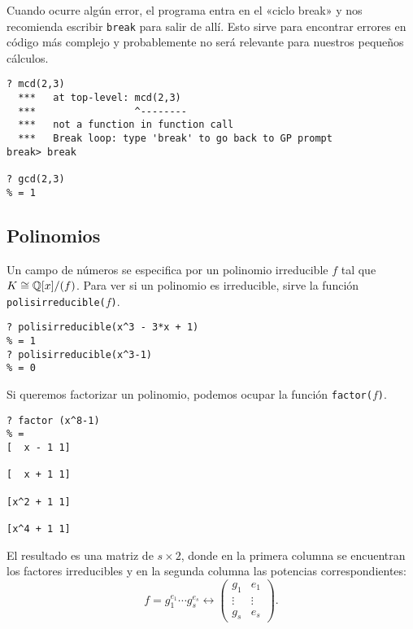 Cuando ocurre algún error, el programa entra en el «ciclo break» y nos
recomienda escribir \texttt{break} para salir de allí. Esto sirve para encontrar
errores en código más complejo y probablemente no será relevante para nuestros
pequeños cálculos.

\begin{shaded}
\begin{verbatim}
? mcd(2,3)
  ***   at top-level: mcd(2,3)
  ***                 ^--------
  ***   not a function in function call
  ***   Break loop: type 'break' to go back to GP prompt
break> break

? gcd(2,3)
% = 1
\end{verbatim}
\end{shaded}

\pagebreak


\subsection{Polinomios}

Un campo de números se especifica por un polinomio irreducible $f$ tal que $K
\cong \mathbb{Q} [x]/(f)$. Para ver si un polinomio es irreducible, sirve la función
\texttt{polisirreducible($f$)}.

\begin{shaded}
\begin{verbatim}
? polisirreducible(x^3 - 3*x + 1)
% = 1
? polisirreducible(x^3-1)
% = 0
\end{verbatim}
\end{shaded}

Si queremos factorizar un polinomio, podemos ocupar la función
\texttt{factor($f$)}.

\begin{shaded}
\begin{verbatim}
? factor (x^8-1)
% = 
[  x - 1 1]

[  x + 1 1]

[x^2 + 1 1]

[x^4 + 1 1]
\end{verbatim}
\end{shaded}

El resultado es una matriz de $s\times 2$, donde en la primera columna se
encuentran los factores irreducibles y en la segunda columna las potencias
correspondientes:
\[ f = g_1^{e_1} \cdots g_s^{e_s} \longleftrightarrow
\begin{pmatrix}
  g_1 & e_1 \\
  \vdots & \vdots \\
  g_s & e_s
  \end{pmatrix}. \]

